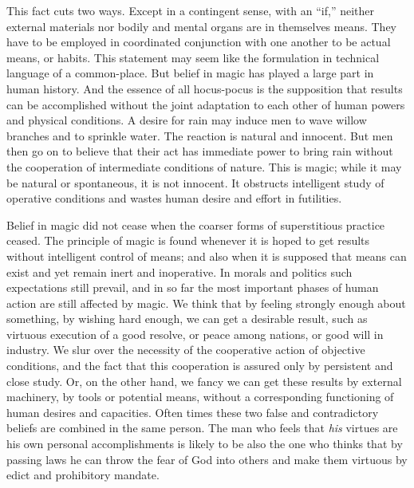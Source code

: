 \documentclass[12pt]{article}
\begin{document}
This fact cuts two ways. Except in a contingent
sense, with an ``if,'' neither external materials nor bodily
and mental organs are in themselves means. They
have to be employed in coordinated conjunction with
one another to be actual means, or habits. This statement
may seem like the formulation in technical language
of a common-place. But belief in magic has
played a large part in human history. And the essence
of all hocus-pocus is the supposition that results
can be accomplished without the joint adaptation to
each other of human powers and physical conditions.
A desire for rain may induce men to wave willow
branches and to sprinkle water. The reaction is natural
and innocent. But men then go on to believe that
their act has immediate power to bring rain without
the cooperation of intermediate conditions of nature.
This is magic; while it may be natural or spontaneous,
it is not innocent. It obstructs intelligent study of
operative conditions and wastes human desire and effort
in futilities.

Belief in magic did not cease when the coarser forms
of superstitious practice ceased. The principle of
magic is found whenever it is hoped to get results
without intelligent control of means; and also when it
is supposed that means can exist and yet remain inert
and inoperative. In morals and politics such expectations
still prevail, and in so far the most important
phases of human action are still affected by magic. We
think that by feeling strongly enough about something,
by wishing hard enough, we can get a desirable result,
such as virtuous execution of a good resolve, or peace
among nations, or good will in industry. We slur over
the necessity of the cooperative action of objective
conditions, and the fact that this cooperation is assured
only by persistent and close study. Or, on the
other hand, we fancy we can get these results by
external machinery, by tools or potential means, without
a corresponding functioning of human desires and
capacities. Often times these two false and contradictory
beliefs are combined in the same person. The man
who feels that \emph{his} virtues are his own personal accomplishments
is likely to be also the one who thinks that
by passing laws he can throw the fear of God into
others and make them virtuous by edict and prohibitory
mandate.
\end{document}
